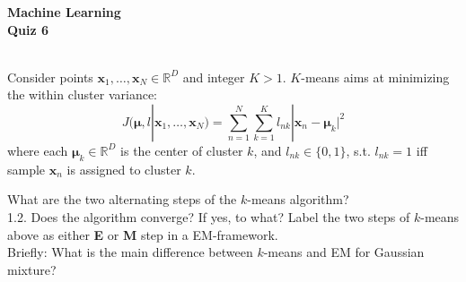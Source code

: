 \documentclass[11pt,noanswers,addpoints]{exam}
\renewcommand{\boldsymbol}[1]{\pmb{#1}}
\newcommand{\R}{\mathbb R}
\newcommand{\x}{\mathbf x}
\begin{document}
{\Large{\textbf{Machine Learning}}} \\[2mm]
\textbf{\Huge{Quiz 6}}

\hfill\hfill{}\\

Consider points $\x_1,\ldots,\x_N\in\R^D$ and integer $K>1$. $K$-means aims at minimizing the within cluster variance:
$$J(\boldsymbol\mu,l|\x_1,\ldots,\x_N) = \sum_{n=1}^N\sum_{k=1}^K l_{nk}|\x_n-\boldsymbol\mu_k|^2$$
where each $\boldsymbol\mu_k\in\R^D$ is the center of cluster $k$, and $l_{nk}\in\{0,1\}$, s.t. $l_{nk}=1$ iff sample $\x_n$ is assigned to cluster $k$.
\begin{questions}
\question[1] What are the two alternating steps of the $k$-means algorithm?\\[0.5in]
1.\hspace{0.4\textwidth}2.\vspace{0.5in}
\question[1] Does the algorithm converge? If yes, to what?\vspace{1in}
\question[1] Label the two steps of $k$-means above as either \textbf{E} or \textbf{M} step in a EM-framework.\\[.5in]
\question[1] Briefly: What is the main difference between $k$-means and EM for Gaussian mixture?
\end{questions}
\end{document}
